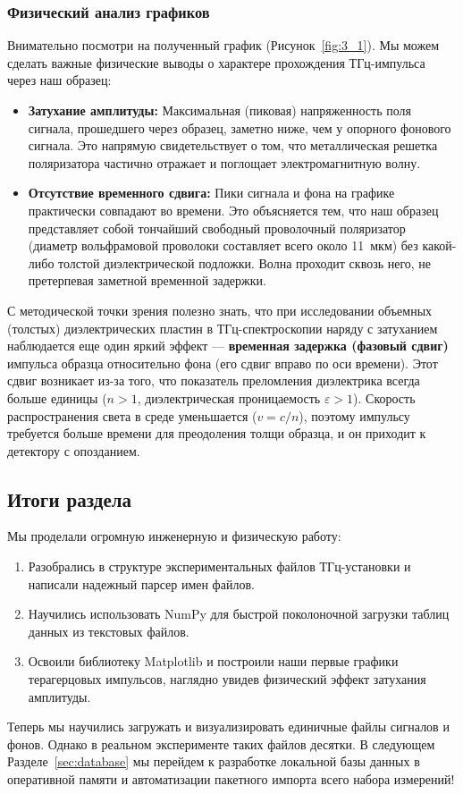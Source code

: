 \subsubsection{Физический анализ графиков}
Внимательно посмотри на полученный график (Рисунок~\ref{fig:3_1}). Мы можем сделать важные физические выводы о характере прохождения ТГц-импульса через наш образец:
\begin{itemize}
    \item \textbf{Затухание амплитуды:} Максимальная (пиковая) напряженность поля сигнала, прошедшего через образец, заметно ниже, чем у опорного фонового сигнала. Это напрямую свидетельствует о том, что металлическая решетка поляризатора частично отражает и поглощает электромагнитную волну.
    \item \textbf{Отсутствие временного сдвига:} Пики сигнала и фона на графике практически совпадают во времени. Это объясняется тем, что наш образец представляет собой тончайший свободный проволочный поляризатор (диаметр вольфрамовой проволоки составляет всего около 11~мкм) без какой-либо толстой диэлектрической подложки. Волна проходит сквозь него, не претерпевая заметной временной задержки.
\end{itemize}

С методической точки зрения полезно знать, что при исследовании объемных (толстых) диэлектрических пластин в ТГц-спектроскопии наряду с затуханием наблюдается еще один яркий эффект --- \textbf{временная задержка (фазовый сдвиг)} импульса образца относительно фона (его сдвиг вправо по оси времени). Этот сдвиг возникает из-за того, что показатель преломления диэлектрика всегда больше единицы ($n > 1$, диэлектрическая проницаемость $\varepsilon > 1$). Скорость распространения света в среде уменьшается ($v = c/n$), поэтому импульсу требуется больше времени для преодоления толщи образца, и он приходит к детектору с опозданием.

\subsection{Итоги раздела}

Мы проделали огромную инженерную и физическую работу:
\begin{enumerate}
    \item Разобрались в структуре экспериментальных файлов ТГц-установки и написали надежный парсер имен файлов.
    \item Научились использовать NumPy для быстрой поколоночной загрузки таблиц данных из текстовых файлов.
    \item Освоили библиотеку Matplotlib и построили наши первые графики терагерцовых импульсов, наглядно увидев физический эффект затухания амплитуды.
\end{enumerate}

Теперь мы научились загружать и визуализировать единичные файлы сигналов и фонов. Однако в реальном эксперименте таких файлов десятки. В следующем Разделе~\ref{sec:database} мы перейдем к разработке локальной базы данных в оперативной памяти и автоматизации пакетного импорта всего набора измерений!